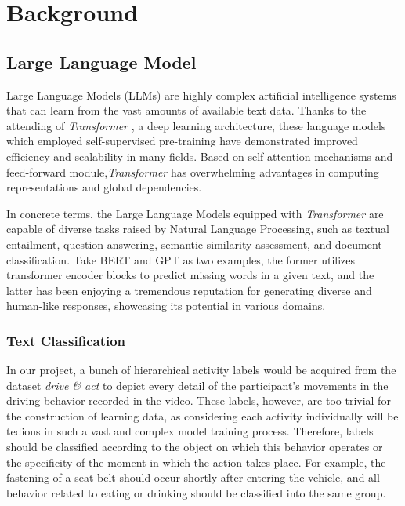 

\chapter{Background}\label{chapter:background}


\section{Large Language Model}
Large Language Models (LLMs) are highly complex artificial intelligence systems that can learn from the vast amounts of available text data\cite{radford2018improving}. Thanks to the attending of \textit{Transformer} \cite{vaswani2017attention}, a deep learning architecture, these language models which employed self-supervised pre-training have demonstrated improved efficiency and scalability in many fields.
 Based on self-attention mechanisms and feed-forward module,\textit{Transformer} has overwhelming advantages in computing representations and global dependencies.

In concrete terms, the Large Language Models equipped with \textit{Transformer} are capable of diverse tasks raised by Natural Language Processing\cite{chowdhary2020natural}, such as textual entailment, question answering, semantic similarity assessment, and document classification. Take BERT\cite{alaparthi2020bidirectional} and GPT \cite{radford2018improving,radford2019language,brown2020language} as two examples, the former utilizes transformer encoder blocks to predict missing words in a given text, and the latter has been enjoying a tremendous reputation for generating diverse and human-like responses, showcasing its potential in various domains.

    \subsection{Text Classification}
In our project, a bunch of hierarchical activity labels would be acquired from the dataset \textit{drive \& act} to depict every detail of the participant's movements in the driving behavior recorded in the video. These labels, however, are too trivial for the construction of learning data, as considering each activity individually will be tedious in such a vast and complex model training process. Therefore, labels should be classified according to the object on which this behavior operates or the specificity of the moment in which the action takes place. For example, the fastening of a seat belt should occur shortly after entering the vehicle, and all behavior related to eating or drinking should be classified into the same group.

